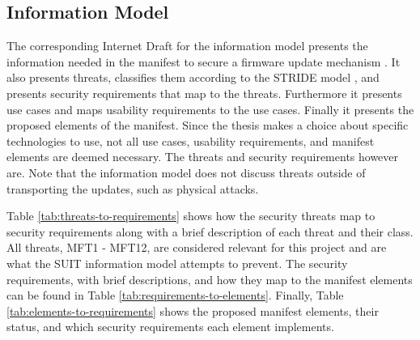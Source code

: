 \documentclass[0-thesis.tex]{subfiles}
\begin{document}

\subsection{Information Model}
The corresponding Internet Draft for the information model presents the information needed 
in the manifest to secure a firmware update mechanism \parencite{suit-information-model}. 
It also presents threats, classifies them according to the STRIDE model \parencite{stride}, 
and presents security requirements that map to the threats. Furthermore it presents use 
cases and maps usability requirements to the use cases. Finally it presents the proposed 
elements of the manifest. Since the thesis makes a choice about specific technologies to 
use, not all use cases, usability requirements, and manifest elements are deemed necessary. 
The threats and security requirements however are. Note that the information model does not 
discuss threats outside of transporting the updates, such as physical attacks.

Table \ref{tab:threats-to-requirements} shows how the security threats map to security 
requirements along with a brief description of each threat and their class. All threats, 
MFT1 - MFT12, are considered relevant for this project and are what the SUIT information model 
attempts to prevent. The security requirements, with brief descriptions, and how they map to 
the manifest elements can be found in Table \ref{tab:requirements-to-elements}. Finally, 
Table \ref{tab:elements-to-requirements} shows the proposed manifest elements, their status, 
and which security requirements each element implements.
\end{document}
